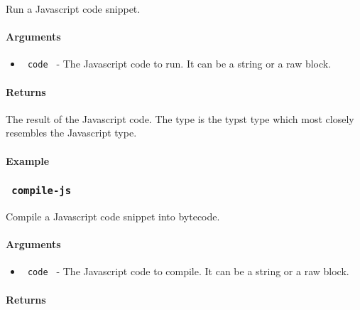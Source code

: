 Run a Javascript code snippet.

\paragraph{Arguments}\label{arguments}

\begin{itemize}
\tightlist
\item
  \texttt{\ code\ } - The Javascript code to run. It can be a string or
  a raw block.
\end{itemize}

\paragraph{Returns}\label{returns}

The result of the Javascript code. The type is the typst type which most
closely resembles the Javascript type.

\paragraph{Example}\label{example-1}

\begin{Shaded}
\begin{Highlighting}[]
\end{Highlighting}
\end{Shaded}

\subsubsection{\texorpdfstring{\texttt{\ compile-js\ }}{ compile-js }}\label{compile-js}

Compile a Javascript code snippet into bytecode.

\paragraph{Arguments}\label{arguments-1}

\begin{itemize}
\tightlist
\item
  \texttt{\ code\ } - The Javascript code to compile. It can be a string
  or a raw block.
\end{itemize}

\paragraph{Returns}\label{returns-1}

